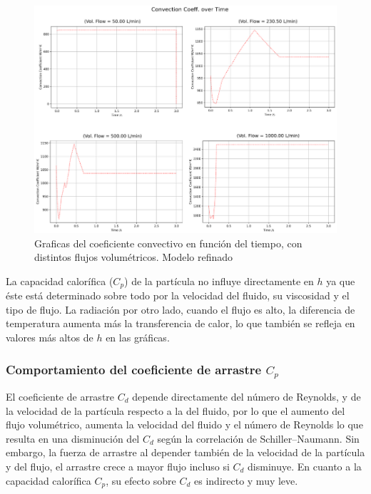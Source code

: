 \documentclass[11pt,stdletter,orderfromtodate,sigleft,twoside]{report}
\begin{document}
\begin{figure}[H]
    \centering
    \includegraphics[width=0.7\linewidth]{figures/Radcte3.png}
    \caption{Graficas del coeficiente convectivo en función del tiempo, con distintos flujos volumétricos. Modelo refinado}
    \label{fig:enter-label}
\end{figure}

La capacidad calorífica ($C_p$) de la partícula no influye directamente en $h$ ya que éste está determinado sobre todo por la velocidad del fluido, su viscosidad y el tipo de flujo. La radiación por otro lado, cuando el flujo es alto, la diferencia de temperatura aumenta más la transferencia de calor, lo que también se refleja en valores más altos de $h$ en las gráficas.

\subsubsection{Comportamiento del coeficiente de arrastre $C_p$}

El coeficiente de arrastre $C_d$ depende directamente del número de Reynolds, y de la velocidad de la partícula respecto a la del fluido, por lo que el aumento del flujo volumétrico, aumenta la velocidad del fluido y el número de Reynolds lo que resulta en una disminución del $C_d$ según la correlación de Schiller–Naumann. Sin embargo, la fuerza de arrastre al depender también de la velocidad de la partícula y del flujo, el arrastre crece a mayor flujo incluso si $C_d$ disminuye. En cuanto a la capacidad calorífica $C_p$, su efecto sobre $C_d$ es indirecto y muy leve.
\end{document}
